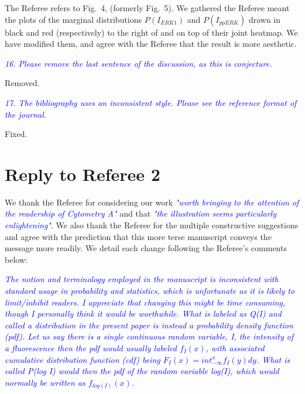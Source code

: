 \documentclass[letter,11pt,draft]{article}
\newcommand{\re}[1]{\emph{\textcolor{blue}{#1}}}
\begin{document}
\smallskip
The Referee refers to Fig.~4, (formerly Fig.~5). We gathered the Referee meant the plots of the marginal distributions $P(I_{ERK1})$ and $P(I_{ppERK})$ drawn in black and red (respectively) to the right of and on top of their joint heatmap. We have modified them, and agree with the Referee that the result is more aesthetic.

\re{
16. Please remove the last sentence of the discussion, as this is conjecture.
}

\smallskip
Removed.

\re{
17. The bibliography uses an inconsistent style. Please see the reference format of the journal.
}

\smallskip
Fixed.

\newpage

\section*{Reply to Referee 2}

We thank the Referee for considering our work \re{"worth bringing to the attention of the readership of Cytometry A"} and that \re{"the illustration seems particularly enlightening"}. We also thank the Referee for the multiple constructive suggestions and agree with the prediction that this more terse manuscript conveys the message more readily. We detail each change following the Referee's comments below:

\smallskip
\re{The notion and terminology employed in the manuscript is inconsistent with standard usage in probability and statistics, which is unfortunate as it is likely to limit/inhibit readers. I appreciate that changing this might be time consuming, though I personally think it would be worthwhile.
}
\re{What is labeled as Q(I) and called a distribution in the present paper is instead a probability density function (pdf). Let us say there is a single continuous random variable, I, the intensity of a fluorescence then the pdf would usually labeled $f_I(x)$, with associated cumulative distribution function (cdf) being $F_I(x) = int_{-\infty}^x f_I(y) dy$. What is called P(log I) would then the pdf of the random variable log(I), which would normally be written as $f_{log(I)}(x)$.}
\end{document}
